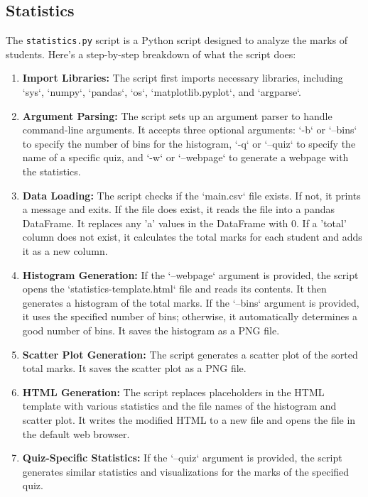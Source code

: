 \documentclass{article}
\begin{document}
\subsection{Statistics}
The \texttt{statistics.py} script is a Python script designed to analyze the marks of students. Here's a step-by-step breakdown of what the script does:

\begin{enumerate}
    \item \textbf{Import Libraries:} The script first imports necessary libraries, including `sys`, `numpy`, `pandas`, `os`, `matplotlib.pyplot`, and `argparse`.

    \item \textbf{Argument Parsing:} The script sets up an argument parser to handle command-line arguments. It accepts three optional arguments: `-b` or `--bins` to specify the number of bins for the histogram, `-q` or `--quiz` to specify the name of a specific quiz, and `-w` or `--webpage` to generate a webpage with the statistics.

    \item \textbf{Data Loading:} The script checks if the `main.csv` file exists. If not, it prints a message and exits. If the file does exist, it reads the file into a pandas DataFrame. It replaces any 'a' values in the DataFrame with 0. If a 'total' column does not exist, it calculates the total marks for each student and adds it as a new column.

    \item \textbf{Histogram Generation:} If the `--webpage` argument is provided, the script opens the `statistics-template.html` file and reads its contents. It then generates a histogram of the total marks. If the `--bins` argument is provided, it uses the specified number of bins; otherwise, it automatically determines a good number of bins. It saves the histogram as a PNG file.

    \item \textbf{Scatter Plot Generation:} The script generates a scatter plot of the sorted total marks. It saves the scatter plot as a PNG file.

    \item \textbf{HTML Generation:} The script replaces placeholders in the HTML template with various statistics and the file names of the histogram and scatter plot. It writes the modified HTML to a new file and opens the file in the default web browser.

    \item \textbf{Quiz-Specific Statistics:} If the `--quiz` argument is provided, the script generates similar statistics and visualizations for the marks of the specified quiz.
\end{enumerate}
\end{document}
